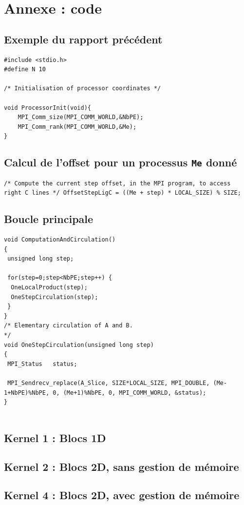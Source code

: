 \documentclass[	DIV=calc,%
							paper=a4,%
							fontsize=11pt%
							]{scrartcl}	 					%
\begin{document}
\section{Annexe : code}

\subsection{Exemple du rapport précédent}%
\begin{lstlisting}
#include <stdio.h>
#define N 10

/* Initialisation of processor coordinates */

void ProcessorInit(void){
	MPI_Comm_size(MPI_COMM_WORLD,&NbPE);
  	MPI_Comm_rank(MPI_COMM_WORLD,&Me);
}
\end{lstlisting}


\subsection*{Calcul de l'offset pour un processus {\texttt{Me} donné}}
\begin{lstlisting}
/* Compute the current step offset, in the MPI program, to access right C lines */ OffsetStepLigC = ((Me + step) * LOCAL_SIZE) % SIZE; 
\end{lstlisting}

\subsection*{Boucle principale}
\begin{lstlisting}
void ComputationAndCirculation()
{
 unsigned long step;
 
 for(step=0;step<NbPE;step++) { 
  OneLocalProduct(step);
  OneStepCirculation(step);
 }
}
/* Elementary circulation of A and B.                                            */
void OneStepCirculation(unsigned long step)
{
 MPI_Status   status;

 MPI_Sendrecv_replace(A_Slice, SIZE*LOCAL_SIZE, MPI_DOUBLE, (Me-1+NbPE)%NbPE, 0, (Me+1)%NbPE, 0, MPI_COMM_WORLD, &status);
}


\end{lstlisting} 

\subsection{Kernel 1 : Blocs 1D}
\subsection{Kernel 2 : Blocs 2D, sans gestion de mémoire}
\subsection{Kernel 4 : Blocs 2D, avec gestion de mémoire}
\end{document}

